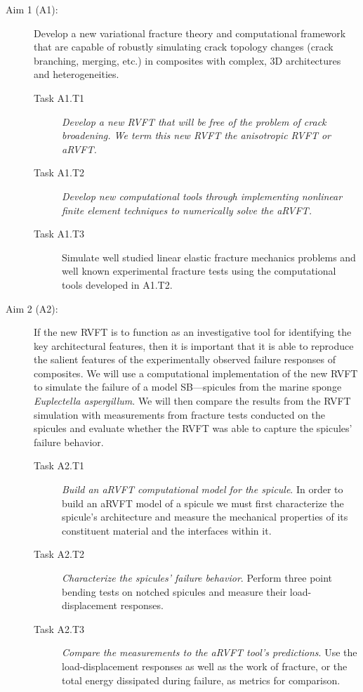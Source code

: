 \documentclass[10pt,letterpaper]{article}
\begin{document}
    \begin{description}
      \item[Aim 1 (A1):] Develop a new variational fracture theory and computational framework that are capable of robustly simulating crack topology changes (crack branching, merging, etc.) in composites with complex, 3D architectures and heterogeneities.
      \begin{description}
        \item[Task A1.T1] \textit{Develop a new RVFT  that will be free of the problem of crack broadening. We term this new RVFT the anisotropic RVFT or aRVFT. }
        \item[Task A1.T2] \textit{Develop new computational tools through implementing  nonlinear finite element techniques  to numerically solve the aRVFT.}
      \item[Task A1.T3] Simulate well studied linear elastic fracture mechanics problems and well known  experimental  fracture tests using the  computational tools developed in A1.T2.

      \end{description}

      \item[Aim 2 (A2):] If the new RVFT is to function as an investigative tool for identifying the key architectural features, then it is important that it is able to reproduce the salient features of the experimentally observed failure responses of composites. We will use a computational implementation of the new RVFT to simulate the failure of a model SB---spicules from the marine sponge \textit{Euplectella aspergillum}. We will then compare the results from the RVFT simulation with measurements from fracture tests conducted on the spicules and evaluate whether the RVFT was able to capture the spicules' failure behavior.
      \begin{description}
        \item[Task A2.T1] \textit{Build an aRVFT computational model for the spicule}. In order to build an aRVFT model of a spicule we must first characterize the spicule's architecture and measure the mechanical properties of its constituent material and the interfaces within it.
        \item[Task A2.T2] \textit{Characterize the spicules' failure behavior}. Perform three point bending tests on notched spicules and measure their load-displacement responses.
        \item[Task A2.T3] \textit{Compare the measurements to the aRVFT tool's predictions}. Use the load-displacement responses as well as the work of fracture, or the total energy dissipated during failure, as metrics for comparison.
      \end{description}
    \end{description}
\end{document}
